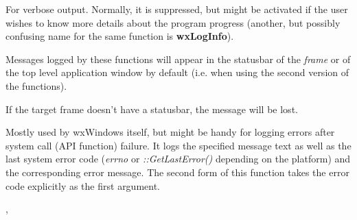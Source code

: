 \label{wxlogverbose}



For verbose output. Normally, it is suppressed, but
might be activated if the user wishes to know more details about the program
progress (another, but possibly confusing name for the same function is {\bf wxLogInfo}).

\label{wxlogstatus}





Messages logged by these functions will appear in the statusbar of the {\it
frame} or of the top level application window by default (i.e. when using
the second version of the functions).

If the target frame doesn't have a statusbar, the message will be lost.

\label{wxlogsyserror}



Mostly used by wxWindows itself, but might be handy for logging errors after
system call (API function) failure. It logs the specified message text as well
as the last system error code ({\it errno} or {\it ::GetLastError()} depending
on the platform) and the corresponding error message. The second form
of this function takes the error code explicitly as the first argument.


,

\label{wxlogdebug}

